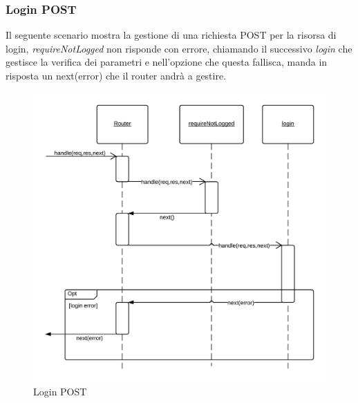 \subsubsection{Login POST} 
Il seguente scenario mostra la gestione di una richiesta POST per la risorsa di login, \emph{requireNotLogged} non risponde con errore, chiamando il successivo  \emph{login} che gestisce la verifica dei parametri e nell'opzione che questa fallisca, manda in risposta un next(error) che il router andrà a gestire.
\begin{figure}[H]
	\begin{center} 
		\includegraphics[scale=0.20]{scenari/login POST.png} 
		\caption{Login POST}
	\end{center} 
\end{figure} 

